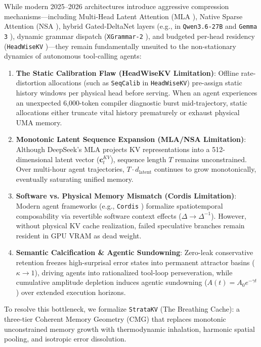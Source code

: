 While modern 2025--2026 architectures introduce aggressive compression mechanisms—including Multi-Head Latent Attention (MLA \cite{deepseek2025mla}), Native Sparse Attention (NSA \cite{deepseek2025nsa}), hybrid Gated-DeltaNet layers (e.g., in \texttt{Qwen3.6-27B} \cite{qwen2026} and \texttt{Gemma 3} \cite{gemma2025}), dynamic grammar dispatch (\texttt{XGrammar-2} \cite{xgrammar2026}), and budgeted per-head residency (\texttt{HeadWiseKV} \cite{xie2026headwisekv})—they remain fundamentally unsuited to the non-stationary dynamics of autonomous tool-calling agents:
\begin{enumerate}
    \item \textbf{The Static Calibration Flaw (HeadWiseKV Limitation)}: Offline rate-distortion allocations (such as \texttt{SeqCalib} in \texttt{HeadWiseKV}) pre-assign static history windows per physical head before serving. When an agent experiences an unexpected 6,000-token compiler diagnostic burst mid-trajectory, static allocations either truncate vital history prematurely or exhaust physical UMA memory.
    \item \textbf{Monotonic Latent Sequence Expansion (MLA/NSA Limitation)}: Although DeepSeek's MLA projects KV representations into a 512-dimensional latent vector ($\mathbf{c}_t^{KV}$), sequence length $T$ remains unconstrained. Over multi-hour agent trajectories, $T \cdot d_{\text{latent}}$ continues to grow monotonically, eventually saturating unified memory.
    \item \textbf{Software vs. Physical Memory Mismatch (Cordis Limitation)}: Modern agent frameworks (e.g., \texttt{Cordis} \cite{shi2026cordis}) formalize spatiotemporal composability via revertible software context effects ($\Delta \to \Delta^{-1}$). However, without physical KV cache realization, failed speculative branches remain resident in GPU VRAM as dead weight.
    \item \textbf{Semantic Calcification \& Agentic Sundowning}: Zero-leak conservative retention freezes high-surprisal error states into permanent attractor basins ($\kappa \to 1$), driving agents into rationalized tool-loop perseveration, while cumulative amplitude depletion induces agentic sundowning ($A(t) = A_0 e^{-\gamma t}$) over extended execution horizons.
\end{enumerate}

To resolve this bottleneck, we formalize \texttt{StrataKV} (The Breathing Cache): a three-tier Coherent Memory Geometry (CMG) that replaces monotonic unconstrained memory growth with thermodynamic inhalation, harmonic spatial pooling, and isotropic error dissolution.

